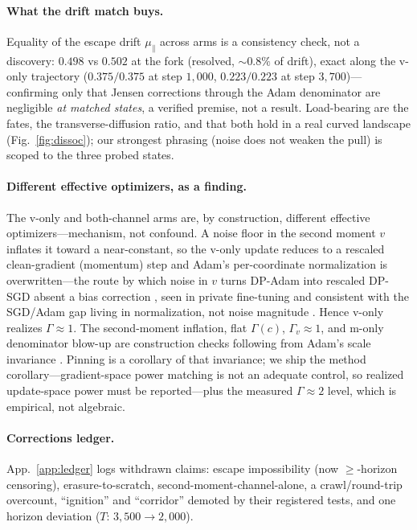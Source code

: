 \documentclass[10pt]{article}
\newcommand{\mupar}{\mu_{\parallel}}
\newcommand{\gam}{\Gamma}
\begin{document}
\paragraph{What the drift match buys.}
Equality of the escape drift $\mupar$ across arms is a consistency check, not a discovery: $0.498$ vs $0.502$ at the fork (resolved, ${\sim}0.8\%$ of drift), exact along the v-only trajectory ($0.375/0.375$ at step $1{,}000$, $0.223/0.223$ at step $3{,}700$)---confirming only that Jensen corrections through the Adam denominator are negligible \emph{at matched states}, a verified premise, not a result. Load-bearing are the fates, the transverse-diffusion ratio, and that both hold in a real curved landscape (Fig.~\ref{fig:dissoc}); our strongest phrasing (noise does not weaken the pull) is scoped to the three probed states.

\paragraph{Different effective optimizers, as a finding.}
The v-only and both-channel arms are, by construction, different effective optimizers---mechanism, not confound. A noise floor in the second moment $v$ inflates it toward a near-constant, so the v-only update reduces to a rescaled clean-gradient (momentum) step and Adam's per-coordinate normalization is overwritten---the route by which noise in $v$ turns DP-Adam into rescaled DP-SGD absent a bias correction \citep{dpadambc}, seen in private fine-tuning \citep{litramer} and consistent with the SGD/Adam gap living in normalization, not noise magnitude \citep{kunstner}. Hence v-only realizes $\gam\approx1$. The second-moment inflation, flat $\gam(c)$, $\gam_v\approx1$, and m-only denominator blow-up are construction checks following from Adam's scale invariance \citep{adam}. Pinning is a corollary of that invariance; we ship the method corollary---gradient-space power matching is not an adequate control, so realized update-space power must be reported---plus the measured $\gam\approx2$ level, which is empirical, not algebraic.

\paragraph{Corrections ledger.}
App.~\ref{app:ledger} logs withdrawn claims: escape impossibility (now ${\geq}$-horizon censoring), erasure-to-scratch, second-moment-channel-alone, a crawl/round-trip overcount, ``ignition'' and ``corridor'' demoted by their registered tests, and one horizon deviation ($T$: $3{,}500\!\to\!2{,}000$).
\end{document}
